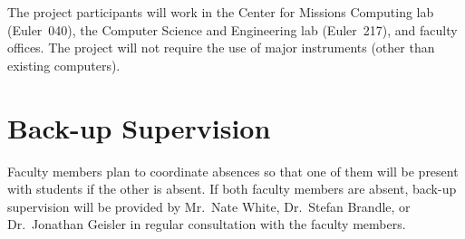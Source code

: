 \documentclass{article}
\begin{document}

The project participants will work in
the Center for Missions Computing lab (Euler~040),
the Computer Science and Engineering lab (Euler~217), and
faculty offices.
The project will not require the use of major instruments
(other than existing computers).

\section{Back-up Supervision}
\label{sec:back-up-supervision}


Faculty members plan to coordinate absences
so that one of them will be present with students if the other is absent.
If both faculty members are absent,
back-up supervision will be provided by
Mr.\ Nate White,
Dr.\ Stefan Brandle, or
Dr.\ Jonathan Geisler
in regular consultation with the faculty members.
\end{document}
